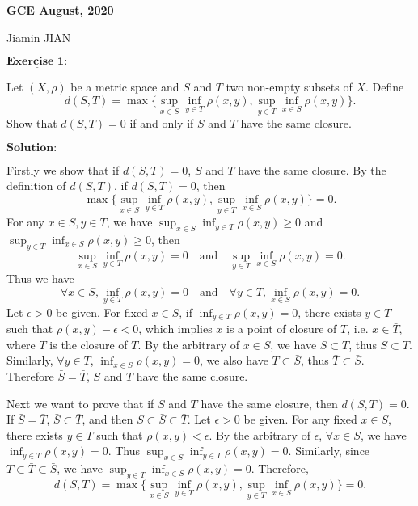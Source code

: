 \documentclass[12pt,a4paper]{ctexart}
\begin{document}
\begin{center}
\textbf{ GCE August, 2020}
\vspace{8pt}

Jiamin JIAN
\end{center}

\vspace{12pt}

$\underline{\textbf{Exercise 1:}}$

Let $(X, \rho)$ be a metric space and $S$ and $T$ two non-empty subsets of $X$. Define
\begin{equation*}
    d(S, T) = \max \{\sup_{x \in S} \inf_{y \in T} \rho(x, y), \sup_{y \in T} \inf_{x \in S} \rho(x, y)\}.
\end{equation*}
Show that $d(S, T) = 0$ if and only if $S$ and $T$ have the same closure.

\vspace{8pt}
$\textbf{Solution:}$

Firstly we show that if $d(S, T) = 0$, $S$ and $T$ have the same closure. By the definition of $d(S, T)$, if $d(S, T) = 0$, then
$$\max \{\sup_{x \in S} \inf_{y \in T} \rho(x, y), \sup_{y \in T} \inf_{x \in S} \rho(x, y)\} = 0.$$
For any $x \in S, y \in T$, we have $\sup_{x \in S} \inf_{y \in T} \rho(x, y) \geq 0$ and $\sup_{y \in T} \inf_{x \in S} \rho(x, y) \geq 0$, then
$$\sup_{x \in S} \inf_{y \in T} \rho(x, y) = 0 \quad  \text{and}  \quad \sup_{y \in T} \inf_{x \in S} \rho(x, y) = 0.$$
Thus we have
$$\forall x \in S, \inf_{y \in T} \rho(x, y) = 0 \quad  \text{and}  \quad \forall y \in T, \inf_{x \in S} \rho(x, y) = 0.$$
Let $\epsilon > 0$ be given. For fixed $x \in S$, if $\inf_{y \in T} \rho(x, y) = 0$, there exists $y \in T$ such that $\rho(x, y) - \epsilon < 0$, which implies $x$ is a point of closure of $T$, i.e. $x \in \bar{T}$, where $\bar{T}$ is the closure of $T$. By the arbitrary of $x \in S$, we have $S \subset \bar{T}$, thus $\bar{S} \subset \bar{T}$. Similarly, $\forall y \in T$, $\inf_{x \in S} \rho(x, y) = 0$, we also have $T \subset \bar{S}$, thus $\bar{T} \subset \bar{S}$. Therefore $\bar{S} = \bar{T}$, $S$ and $T$ have the same closure.

Next we want to prove that if $S$ and $T$ have the same closure, then $d(S, T) = 0$. If $\bar{S} = \bar{T}$, $\bar{S} \subset \bar{T}$, and then $S \subset \bar{S} \subset \bar{T}$. Let $\epsilon > 0$ be given. For any fixed $x \in S$, there exists $y \in T$ such that $\rho(x, y) < \epsilon$. By the arbitrary of $\epsilon$, $\forall x \in S$, we have $\inf_{y \in T} \rho(x, y) = 0$. Thus $\sup_{x \in S} \inf_{y \in T} \rho(x, y) = 0$. Similarly, since $T \subset \bar{T} \subset \bar{S}$, we have $\sup_{y \in T} \inf_{x \in S} \rho(x, y) = 0$. Therefore,
$$d(S, T) = \max \{\sup_{x \in S} \inf_{y \in T} \rho(x, y), \sup_{y \in T} \inf_{x \in S} \rho(x, y)\} = 0.$$
\end{document}
